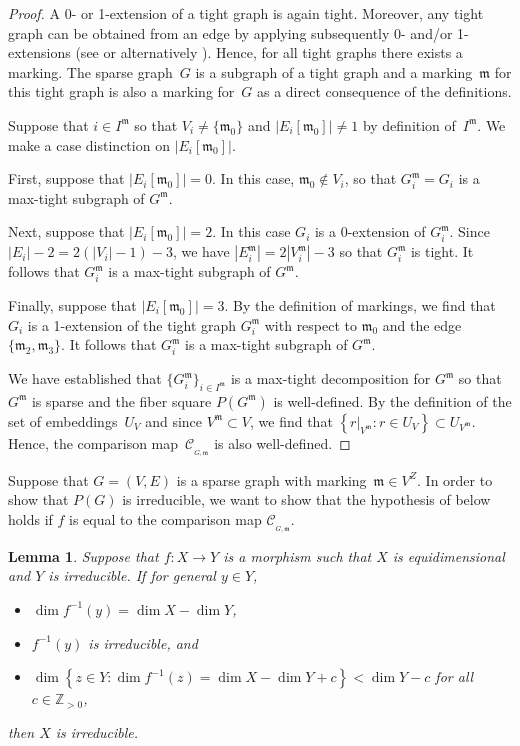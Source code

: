 \documentclass[12pt]{article}
\newtheorem{lemma}{Lemma}
\theoremstyle{definition}
\newtheorem{remark}[lemma]{Remark}
\newenvironment{Mlist}{\begin{itemize}[topsep=0pt,itemsep=0pt,leftmargin=7mm]}{\end{itemize}}
\newcommand{\END}{\hfill $\vartriangleleft$}
\newcommand{\st}{such that }
\newcommand{\wrt}{with respect to }
\renewcommand{\c}{\colon}
\newcommand{\set}[2]{\left\{#1:#2\right\}}
\newcommand{\Z}{{\mathbb{Z}}}
\newcommand{\cC}{\mathcal{C}}
\newcommand{\m}{\mathfrak{m}}
\newcommand{\CM}{\cC_{_{G,\m}}}
\begin{document}
\begin{proof}
A 0- or 1-extension of a tight graph is again tight.
Moreover, any tight graph can be obtained from an edge by applying subsequently 0- and/or 1-extensions
(see \cite{1911,1970} or alternatively \citep[Theorem~19.2]{2019hb}).
Hence, for all tight graphs there exists a marking.
The sparse graph~$G$ is a subgraph of a tight graph
and a marking~$\m$ for this tight graph is also a marking for~$G$ as a direct consequence of the definitions.

Suppose that $i\in I^\m$ so that $V_i\neq\{\m_0\}$ and $|E_i[\m_0]|\neq 1$ by definition of~$I^\m$.
We make a case distinction on $|E_i[\m_0]|$.

First, suppose that $|E_i[\m_0]|=0$. In this case, $\m_0\notin V_i$,
so that $G^\m_i=G_i$ is a max-tight subgraph of $G^\m$.

Next, suppose that $|E_i[\m_0]|=2$.
In this case $G_i$ is a 0-extension of $G^\m_i$.
Since $|E_i|-2=2(|V_i|-1)-3$, we have $|E^\m_i|=2|V^\m_i|-3$ so that $G^\m_i$ is tight.
It follows that $G^\m_i$ is a max-tight subgraph of $G^\m$.

Finally, suppose that $|E_i[\m_0]|=3$.
By the definition of markings,
we find that $G_i$ is a 1-extension of the tight graph $G_i^\m$ \wrt $\m_0$ and the edge~$\{\m_2,\m_3\}$.
It follows that $G^\m_i$ is a max-tight subgraph of $G^\m$.

We have established that $\{G^\m_i\}_{i\in I^\m}$ is a max-tight decomposition for $G^\m$
so that $G^\m$ is sparse and the fiber square $P(G^\m)$ is well-defined.
By the definition of the set of embeddings~$U_V$ and since $V^\m\subset V$,
we find that $\set{r|_{V^\m}}{r\in U_V}\subset U_{V^\m}$.
Hence, the comparison map~$\CM$ is also well-defined.
\end{proof}

Suppose that $G=(V,E)$ is a sparse graph with marking~$\m\in V^Z$.
In order to show that $P(G)$ is irreducible,
we want to show that the hypothesis of  below
holds if $f$ is equal to the comparison map $\CM$.

\begin{lemma}
\label{lem:if}
Suppose that $f\c X\to Y$ is a morphism \st $X$ is equidimensional and $Y$ is irreducible.
If for general $y\in Y$,
\begin{Mlist}
\item
$\dim f^{-1}(y)=\dim X-\dim Y$,
\item
$f^{-1}(y)$ is irreducible, and
\item
$
\dim\set{z\in Y}{\dim f^{-1}(z)=\dim X-\dim Y+c}
<
\dim Y-c
$
for all $c\in\Z_{>0}$,
\end{Mlist}
then $X$ is irreducible.
\end{lemma}
\end{document}
